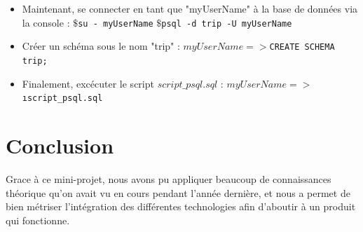 \documentclass[a4paper, 11pt]{article}
\begin{document}
\begin{itemize}
\begin{itemize}
		\item Maintenant, se connecter en tant que "myUserName" à la base de données via la console :
			\newline$\$ $\texttt{su - myUserName}
			\newline$\$ $\texttt{psql -d trip -U myUserName}
		\item Créer un schéma sous le nom "trip" :
			\newline$myUserName=>$\texttt{CREATE SCHEMA trip;}
		\item Finalement, excécuter le script $script\_psql.sql$ :
			\newline$myUserName=>$\texttt{\i script_psql.sql}
	\end{itemize}
\end{itemize}

\section{Conclusion}
Grace à ce mini-projet, nous avons pu appliquer beaucoup de connaissances théorique qu'on avait vu en cours pendant l'année dernière, et nous a permet de bien métriser l'intégration des différentes technologies afin d'aboutir à un produit qui fonctionne.
\end{document}
